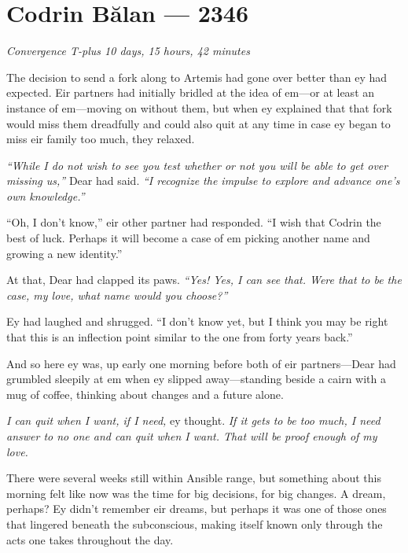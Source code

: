 \hypertarget{codrin-bux103lan-2346}{%
\chapter{Codrin Bălan — 2346}}

\begin{center}
\emph{Convergence T-plus 10 days, 15 hours, 42 minutes}
\end{center}

\noindent The decision to send a fork along to Artemis had gone over better than ey had expected. Eir partners had initially bridled at the idea of em—or at least an instance of em—moving on without them, but when ey explained that that fork would miss them dreadfully and could also quit at any time in case ey began to miss eir family too much, they relaxed.

\emph{``While I do not wish to see you test whether or not you will be able to get over missing us,''} Dear had said. \emph{``I recognize the impulse to explore and advance one's own knowledge.''}

``Oh, I don't know,'' eir other partner had responded. ``I wish that Codrin the best of luck. Perhaps it will become a case of em picking another name and growing a new identity.''

At that, Dear had clapped its paws. \emph{``Yes! Yes, I can see that. Were that to be the case, my love, what name would you choose?''}

Ey had laughed and shrugged. ``I don't know yet, but I think you may be right that this is an inflection point similar to the one from forty years back.''

And so here ey was, up early one morning before both of eir partners—Dear had grumbled sleepily at em when ey slipped away—standing beside a cairn with a mug of coffee, thinking about changes and a future alone.

\emph{I can quit when I want, if I need,} ey thought. \emph{If it gets to be too much, I need answer to no one and can quit when I want. That will be proof enough of my love.}

There were several weeks still within Ansible range, but something about this morning felt like now was the time for big decisions, for big changes. A dream, perhaps? Ey didn't remember eir dreams, but perhaps it was one of those ones that lingered beneath the subconscious, making itself known only through the acts one takes throughout the day.

